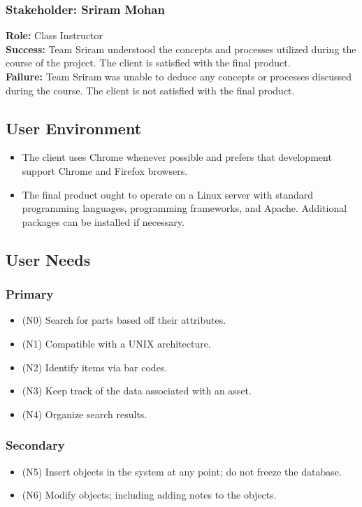 \documentclass{article}
\begin{document}
\subsubsection{Stakeholder: Sriram Mohan}
\textbf{Role:} Class Instructor\\
\textbf{Success:} Team Sriram understood the concepts and processes utilized during the course of the project. The client is satisfied with the final product.\\
\textbf{Failure:} Team Sriram was unable to deduce any concepts or processes discussed during the course. The client is not satisfied with the final product.

\subsection{User Environment}
\begin{itemize}
\item The client uses Chrome whenever possible and prefers that development support Chrome and Firefox browsers.
\item The final product ought to operate on a Linux server with standard programming languages, programming frameworks, and Apache.  Additional packages can be installed if necessary.
\end{itemize}

\subsection{User Needs}
\subsubsection{Primary}
\begin{itemize}
\item (N0) Search for parts based off their attributes.
\item (N1) Compatible with a UNIX architecture.
\item (N2) Identify items via bar codes.
\item (N3) Keep track of the data associated with an asset.
\item (N4) Organize search results.
\end{itemize}
\subsubsection{Secondary}
\begin{itemize}
\item (N5) Insert objects in the system at any point; do not freeze the database.
\item (N6) Modify objects; including adding notes to the objects.
\end{itemize}
\end{document}
